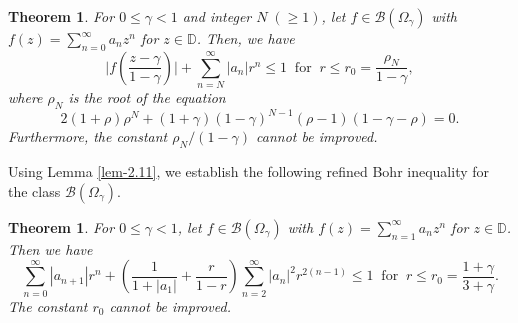 \documentclass[a4paper,12pt]{amsart}
\theoremstyle{plain}
\newtheorem{thm}[equation]{Theorem}
\theoremstyle{definition}
\begin{document}
\begin{thm}\label{th-3.3}
	For $ 0\leq \gamma<1 $ and integer $ N\;(\geq 1) $, let $ f\in\mathcal{B}(\Omega_{\gamma}) $ with $ f(z)=\sum_{n=0}^{\infty}a_nz^n $ for $ z\in\mathbb{D}$. Then, we have 
	\begin{equation*}
		\bigg|f\left(\frac{z-\gamma}{1-\gamma}\right)\bigg|+\sum_{n=N}^{\infty}|a_n|r^n\leq 1 \;\; \text{for}\;\; r\leq r_0=\frac{\rho_N}{1-\gamma},
	\end{equation*}
where $ \rho_N $ is the root of the equation 
\begin{equation}
	2(1+\rho)\rho^N+(1+\gamma)(1-\gamma)^{N-1}(\rho-1)(1-\gamma-\rho)=0.
\end{equation}
	Furthermore, the constant $ {\rho_N}/(1-\gamma) $ cannot be improved. 
\end{thm}

\noindent Using Lemma \ref{lem-2.11}, we establish the following refined Bohr inequality for the class $\mathcal{B}(\Omega_{\gamma})$.
\begin{thm}\label{th-3.5}
For $ 0\leq \gamma<1 $, let $ f\in\mathcal{B}(\Omega_{\gamma}) $ with $ f(z)=\sum_{n=1}^{\infty}a_nz^n $ for $ z\in\mathbb{D}$. Then we have 
\begin{equation*}
	\sum_{n=0}^{\infty}|a_{n+1}|r^n+\left(\frac{1}{1+|a_1|}+\frac{r}{1-r}\right)\sum_{n=2}^{\infty}|a_n|^2r^{2(n-1)}\leq 1 \;\; \text{for}\;\; r\leq r_0=\frac{1+\gamma}{3+\gamma}.
\end{equation*}
The constant $ r_0 $ cannot be improved. 
\end{thm}
\end{document}

